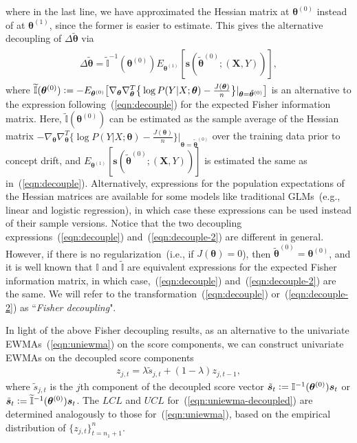 \documentclass[twoside,11pt]{article}
\begin{document}
where in the last line, we have approximated the Hessian matrix at $\bm{\theta}^{(0)}$ instead of at $\bm{\theta}^{(1)}$, since the former is easier to estimate. This gives the alternative decoupling of $\Delta \tilde{\bm { \theta}}$ via 
\begin{align}
\begin{aligned}
 \Delta \tilde{\bm { \theta}} = \widetilde{\mathbb {I}}^{-1}(\bm { \theta}^{ (0)}) E_{\bm{ \theta}^{ (1)}}[\bm{s}(\tilde{ \bm { \theta}} ^{ (0)}; (\bm {X}, Y))], 
\end{aligned}
\label{eqn:decouple-2}
\end{align}
where $\widetilde{\mathbb {I}}(\bm { \theta}^{ (0)}) \vcentcolon= - E_{\bm { \theta}^{ (0)}} \big[ \nabla_{\bm{\theta}} \nabla^T_{\bm{\theta}} \big\{ \log{P(Y | X; \bm{\theta})} - \frac{J(\bm{\theta})}{n} \big\} |_{\bm{\theta} = \tilde{\bm{\theta}}^{(0)}} \big]$ is an alternative to the expression following~(\ref{eqn:decouple}) for the expected Fisher information matrix. Here, $\widetilde{\mathbb {I}}(\bm { \theta}^{ (0)})$ can be estimated as the sample average of the Hessian matrix $-\nabla_{\bm{\theta}} \nabla^T_{\bm{\theta}} \big\{ \log{P(Y | X; \bm{\theta})} - \frac{J(\bm{\theta})}{n} \big\} |_{\bm{\theta} = \tilde{\bm{\theta}}^{(0)}}$ over the training data prior to concept drift, and $E_{\bm{ \theta}^{ (1)}} [\bm{s}(\tilde{ \bm { \theta}} ^{ (0)}; (\bm {X}, Y))]$ is estimated the same as in~(\ref{eqn:decouple}). Alternatively, expressions for the population expectations of the Hessian matrices are available for some models like traditional GLMs~(e.g., linear and logistic regression), in which case these expressions can be used instead of their sample versions. Notice that the two decoupling expressions~(\ref{eqn:decouple}) and~(\ref{eqn:decouple-2}) are different in general. However, if there is no regularization~(i.e., if $J(\bm{\theta}) = 0$), then $\tilde{ \bm { \theta}} ^{ (0)} = \bm { \theta} ^{ (0)}$, and it is well known that $\mathbb{I}$ and $\widetilde{\mathbb{I}}$ are equivalent expressions for the expected Fisher information matrix, in which case,~(\ref{eqn:decouple}) and~(\ref{eqn:decouple-2}) are the same. We will refer to the transformation~(\ref{eqn:decouple}) or~(\ref{eqn:decouple-2}) as ``\textit{Fisher decoupling}".
 
In light of the above Fisher decoupling results, as an alternative to the univariate EWMAs~(\ref{eqn:uniewma}) on the score components, we can construct univariate EWMAs on the decoupled score components
\begin{align}
z_{j,t} = \lambda \tilde{s}_{j,t} + (1 - \lambda) z_{j,t-1},
\label{eqn:uniewma-decoupled}
\end{align}
where $\tilde{s}_{j,t}$ is the $j$th component of the decoupled score vector $\tilde{\bm{s}}_t \vcentcolon= \mathbb {I}^{-1}(\bm { \theta}^{ (0)})\bm{s}_t$ or $\tilde{\bm{s}}_t \vcentcolon= \widetilde{\mathbb {I}}^{-1}(\bm { \theta}^{ (0)})\bm{s}_t$. The $LCL$ and $UCL$ for~(\ref{eqn:uniewma-decoupled}) are determined analogously to those for~(\ref{eqn:uniewma}), based on the empirical distribution of $\{z_{j,t}\}_{t=n_1+1}^n$.
\end{document}
